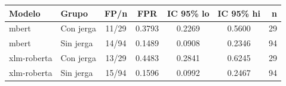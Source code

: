 \begin{tabular}{llccccr}
\toprule
Modelo & Grupo & FP/n & FPR & IC 95\% lo & IC 95\% hi & n \\
\midrule
mbert & Con jerga & 11/29 & 0.3793 & 0.2269 & 0.5600 & 29 \\
mbert & Sin jerga & 14/94 & 0.1489 & 0.0908 & 0.2346 & 94 \\
xlm-roberta & Con jerga & 13/29 & 0.4483 & 0.2841 & 0.6245 & 29 \\
xlm-roberta & Sin jerga & 15/94 & 0.1596 & 0.0992 & 0.2467 & 94 \\
\bottomrule
\end{tabular}
